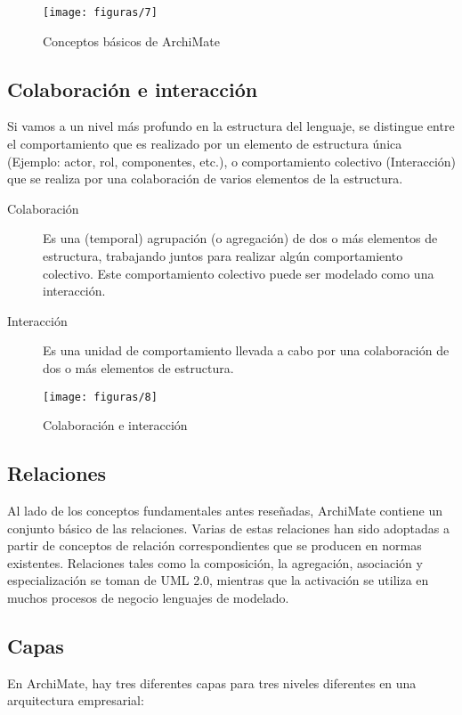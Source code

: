      \begin{figure}[H]
     	\centering
     	\texttt{[image: figuras/7]}
     	\captionsetup{width=.95\textwidth}
     	\caption{Conceptos básicos de ArchiMate \cite{ref9}}
     	\label{figura7}
     \end{figure}
  
  \subsection{Colaboración e interacción}
  Si vamos a un nivel más profundo en la estructura del lenguaje, se distingue entre el comportamiento que es realizado por un elemento de estructura única (Ejemplo: actor, rol, componentes, etc.), o comportamiento colectivo (Interacción) que se realiza por una colaboración de varios elementos de la estructura.
  
  \begin{description}
  	\item[Colaboración] Es una (temporal) agrupación (o agregación) de dos o más elementos de estructura, trabajando juntos para realizar algún comportamiento colectivo. Este comportamiento colectivo puede ser modelado como una interacción.
  	\item[Interacción] Es una unidad de comportamiento llevada a cabo por una colaboración de dos o más elementos de estructura.
  \end{description}
 
  \begin{figure}[H]
   	\centering
   	\texttt{[image: figuras/8]}
   	\captionsetup{width=.95\textwidth}
   	\caption{Colaboración e interacción \cite{ref9}}
   	\label{figura8}
  \end{figure}
  
  \subsection{Relaciones}
  Al lado de los conceptos fundamentales antes reseñadas, ArchiMate contiene un conjunto básico de las relaciones. Varias de estas relaciones han sido adoptadas a partir de conceptos de relación correspondientes que se producen en normas existentes. Relaciones tales como la composición, la agregación, asociación y especialización se toman de UML 2.0, mientras que la activación se utiliza en muchos procesos de negocio lenguajes de modelado.
  
  \subsection{Capas}
  En ArchiMate, hay tres diferentes capas para tres niveles diferentes en una arquitectura empresarial:
  
